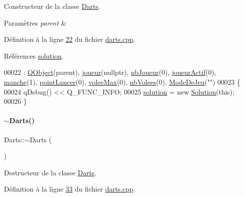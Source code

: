 Constructeur de la classe \hyperlink{class_darts}{Darts}. 


\begin{DoxyParams}{Paramètres}
{\em parent} & \\
\hline
\end{DoxyParams}


Définition à la ligne \hyperlink{darts_8cpp_source_l00022}{22} du fichier \hyperlink{darts_8cpp_source}{darts.\+cpp}.



Références \hyperlink{darts_8h_source_l00072}{solution}.


\begin{DoxyCode}
00022                             : \hyperlink{class_q_object}{QObject}(parent), \hyperlink{class_darts_a97cc62d823c3d41604bb4a2d329ddfea}{joueur}(\textcolor{keyword}{nullptr}), 
      \hyperlink{class_darts_ac5ae0e3546d00f59adba76c4ece71725}{nbJoueur}(0), \hyperlink{class_darts_a68fb01b9aad6502e4429dfbf2a72d50b}{joueurActif}(0), \hyperlink{class_darts_ac7b7bd23e64b4fab3895f02f085ea85f}{manche}(1), \hyperlink{class_darts_a7ed0e6c9c07930603f85c2bac5b9d78b}{pointLancer}(0), 
      \hyperlink{class_darts_aed9c6aa8f34fb2dcbc57a5ea24aa6c2a}{voleeMax}(0), \hyperlink{class_darts_ae73a0b876ca354c7abd0d39db15c94fa}{nbVolees}(0), \hyperlink{class_darts_a281fd6201343dfb65ab81c93fd60f786}{ModeDeJeu}(\textcolor{stringliteral}{""})
00023 \{
00024     qDebug() << Q\_FUNC\_INFO;
00025     \hyperlink{class_darts_a40733010dc6ae4ce93140804b4d191ea}{solution} = \textcolor{keyword}{new} \hyperlink{class_solution}{Solution}(\textcolor{keyword}{this});
00026 \}
\end{DoxyCode}
\mbox{\label{class_darts_a335882c9fccd527d5c33a509269e0997}} 
\paragraph{\texorpdfstring{$\sim$\+Darts()}{~Darts()}}
{\footnotesize\ttfamily Darts\+::$\sim$\+Darts (\begin{DoxyParamCaption}{ }\end{DoxyParamCaption})}



Destructeur de la classe \hyperlink{class_darts}{Darts}. 



Définition à la ligne \hyperlink{darts_8cpp_source_l00033}{33} du fichier \hyperlink{darts_8cpp_source}{darts.\+cpp}.


